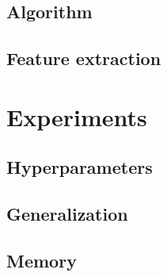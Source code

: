 \subsection{Algorithm}

\subsection{Feature extraction}

\section{Experiments}

\subsection{Hyperparameters}

\subsection{Generalization}

\subsection{Memory}











